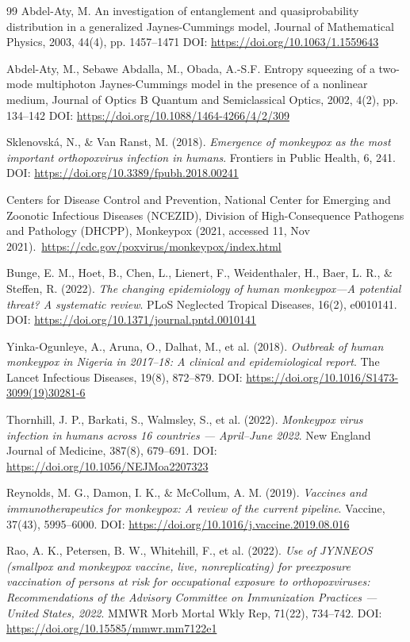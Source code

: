 \documentclass[10pt]{NSP1}
\begin{document}
\begin{thebibliography}{99}
 Abdel-Aty, M.
An investigation of entanglement and quasiprobability distribution in a generalized Jaynes-Cummings model, Journal of Mathematical Physics, 2003, 44(4), pp. 1457--1471 DOI: \url{https://doi.org/10.1063/1.1559643}

 Abdel-Aty, M., Sebawe Abdalla, M., Obada, A.-S.F.
Entropy squeezing of a two-mode multiphoton Jaynes-Cummings model in the presence of a nonlinear medium, Journal of Optics B Quantum and Semiclassical Optics, 2002, 4(2), pp. 134--142 DOI: \url{https://doi.org/10.1088/1464-4266/4/2/309}

Sklenovská, N., \& Van Ranst, M. (2018). \emph{Emergence of monkeypox as the most important orthopoxvirus infection in humans}. Frontiers in Public Health, 6, 241. DOI: \url{https://doi.org/10.3389/fpubh.2018.00241}

Centers for Disease Control and Prevention, National Center for Emerging and Zoonotic Infectious Diseases (NCEZID), Division of High-Consequence Pathogens and Pathology (DHCPP), Monkeypox (2021, accessed 11, Nov 2021).~\url{https://cdc.gov/poxvirus/monkeypox/index.html}

Bunge, E. M., Hoet, B., Chen, L., Lienert, F., Weidenthaler, H., Baer, L. R., \& Steffen, R. (2022). \emph{The changing epidemiology of human monkeypox---A potential threat? A systematic review}. PLoS Neglected Tropical Diseases, 16(2), e0010141. DOI: \url{https://doi.org/10.1371/journal.pntd.0010141}

Yinka-Ogunleye, A., Aruna, O., Dalhat, M., et al. (2018). \emph{Outbreak of human monkeypox in Nigeria in 2017--18: A clinical and epidemiological report}. The Lancet Infectious Diseases, 19(8), 872--879. DOI: \url{https://doi.org/10.1016/S1473-3099(19)30281-6}

Thornhill, J. P., Barkati, S., Walmsley, S., et al. (2022). \emph{Monkeypox virus infection in humans across 16 countries --- April--June 2022}. New England Journal of Medicine, 387(8), 679--691. DOI: \url{https://doi.org/10.1056/NEJMoa2207323}

Reynolds, M. G., Damon, I. K., \& McCollum, A. M. (2019). \emph{Vaccines and immunotherapeutics for monkeypox: A review of the current pipeline}. Vaccine, 37(43), 5995--6000. DOI: \url{https://doi.org/10.1016/j.vaccine.2019.08.016}

Rao, A. K., Petersen, B. W., Whitehill, F., et al. (2022). \emph{Use of JYNNEOS (smallpox and monkeypox vaccine, live, nonreplicating) for preexposure vaccination of persons at risk for occupational exposure to orthopoxviruses: Recommendations of the Advisory Committee on Immunization Practices --- United States, 2022}. MMWR Morb Mortal Wkly Rep, 71(22), 734--742. DOI: \url{https://doi.org/10.15585/mmwr.mm7122e1}


\end{thebibliography}
\end{document}
